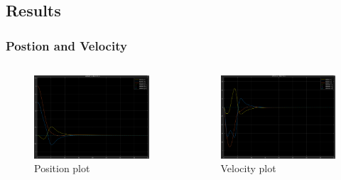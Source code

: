 \documentclass{beamer}
\begin{document}
\subsection{Results}

\begin{frame}
    \frametitle{Postion and Velocity}

    \begin{columns}

        \begin{figure}[h]
            \centering
            \includegraphics[width=1\textwidth]{position.png}
            \caption{Position plot}
            \label{fig:postion}
        \end{figure}

        \begin{figure}[h]
            \centering
            \includegraphics[width=1\textwidth]{velocity.png}
            \caption{Velocity plot}
            \label{fig:velocity}
        \end{figure}
    \end{columns}
\end{frame}
\end{document}
